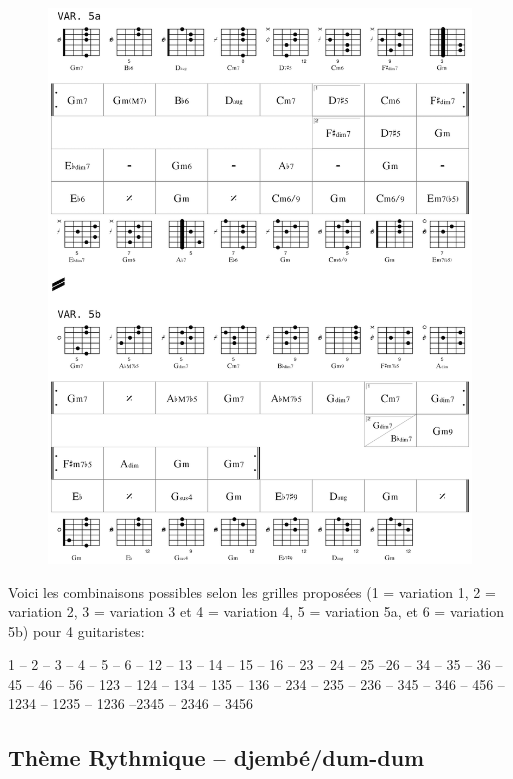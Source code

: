  \begin{figure}[H]
\begin{center}
\includegraphics[scale=0.33]{img/dlc4}
\end{center}
\end{figure}

Voici les combinaisons possibles selon les grilles proposées (1 = variation 1, 2 = variation 2, 3 = variation 3 et 4 = variation 4, 5 = variation 5a, et 6 = variation 5b) pour 4 guitaristes: 

1 -- 2 -- 3 -- 4 -- 5 -- 6 -- 12 -- 13 -- 14 -- 15 -- 16 --  23 -- 24 -- 25 --26 -- 34 -- 35 -- 36 -- 45 -- 46 -- 56 -- 123 -- 124 -- 134 -- 135 -- 136 -- 234 -- 235 -- 236 -- 345 -- 346 -- 456 -- 1234 -- 1235 -- 1236 --2345 -- 2346 -- 3456 %
 
\bigskip

\subsection*{Thème Rythmique -- djembé/dum-dum}

